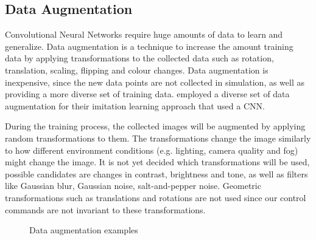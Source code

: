 

\subsection*{Data Augmentation}

Convolutional Neural Networks require huge amounts of data to learn and generalize. Data augmentation is a technique to increase the amount training data by applying transformations to the collected data such as rotation, translation, scaling, flipping and colour changes. Data augmentation is inexpensive, since the new data points are not collected in simulation, as well as providing a more diverse set of training data. \autocite{conditional_imitation_learning} employed a diverse set of data augmentation for their imitation learning approach that used a CNN.

During the training process, the collected images will be augmented by applying random transformations to them. The transformations change the image similarly to how different environment conditions (e.g. lighting, camera quality and fog) might change the image. It is not yet decided which transformations will be used, possible candidates are changes in contrast, brightness and tone, as well as filters like Gaussian blur, Gaussian noise, salt-and-pepper noise.
Geometric transformations such as translations and rotations are not used since our control commands are not invariant to these transformations.

\begin{figure}
     \centering
     \caption{Data augmentation examples}
     \label{fig:data_augmentation}
\end{figure}




